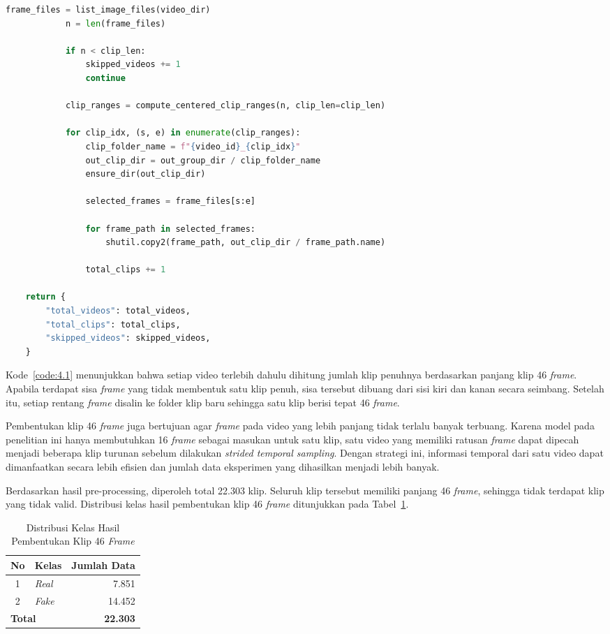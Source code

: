 \begin{lstlisting}[language=Python, caption={Pembentukan Klip 46 \textit{Frame}}, label={code:4.1}]
			frame_files = list_image_files(video_dir)
			n = len(frame_files)

			if n < clip_len:
				skipped_videos += 1
				continue

			clip_ranges = compute_centered_clip_ranges(n, clip_len=clip_len)

			for clip_idx, (s, e) in enumerate(clip_ranges):
				clip_folder_name = f"{video_id}_{clip_idx}"
				out_clip_dir = out_group_dir / clip_folder_name
				ensure_dir(out_clip_dir)

				selected_frames = frame_files[s:e]

				for frame_path in selected_frames:
					shutil.copy2(frame_path, out_clip_dir / frame_path.name)

				total_clips += 1

	return {
		"total_videos": total_videos,
		"total_clips": total_clips,
		"skipped_videos": skipped_videos,
	}
\end{lstlisting}

Kode~\ref{code:4.1} menunjukkan bahwa setiap video terlebih dahulu dihitung jumlah klip penuhnya berdasarkan panjang klip 46 \textit{frame}. Apabila terdapat sisa \textit{frame} yang tidak membentuk satu klip penuh, sisa tersebut dibuang dari sisi kiri dan kanan secara seimbang. Setelah itu, setiap rentang \textit{frame} disalin ke folder klip baru sehingga satu klip berisi tepat 46 \textit{frame}.

Pembentukan klip 46 \textit{frame} juga bertujuan agar \textit{frame} pada video yang lebih panjang tidak terlalu banyak terbuang. Karena model pada penelitian ini hanya membutuhkan 16 \textit{frame} sebagai masukan untuk satu klip, satu video yang memiliki ratusan \textit{frame} dapat dipecah menjadi beberapa klip turunan sebelum dilakukan \textit{strided temporal sampling}. Dengan strategi ini, informasi temporal dari satu video dapat dimanfaatkan secara lebih efisien dan jumlah data eksperimen yang dihasilkan menjadi lebih banyak.

Berdasarkan hasil pre-processing, diperoleh total 22.303 klip. Seluruh klip tersebut memiliki panjang 46 \textit{frame}, sehingga tidak terdapat klip yang tidak valid. Distribusi kelas hasil pembentukan klip 46 \textit{frame} ditunjukkan pada Tabel~\ref{table:4.klip46}.

\begin{table}[htbp]
	\centering
	\caption{Distribusi Kelas Hasil Pembentukan Klip 46 \textit{Frame}}
	\label{table:4.klip46}
	\begin{tabular}{clr}
		\toprule
		\textbf{No} & \textbf{Kelas} & \textbf{Jumlah Data} \\
		\midrule
		1 & \textit{Real} & 7.851 \\
		2 & \textit{Fake} & 14.452 \\
		\midrule
		\multicolumn{2}{l}{\textbf{Total}} & \textbf{22.303} \\
		\bottomrule
	\end{tabular}
\end{table}

